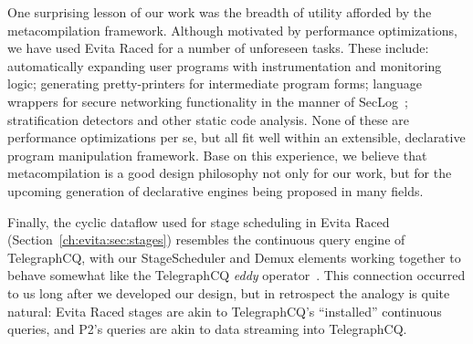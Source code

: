 One surprising lesson of our work was the breadth of utility afforded by the
metacompilation framework.  Although motivated by performance optimizations, we
have used Evita Raced for a number of unforeseen tasks.  These include:
automatically expanding user programs with instrumentation and monitoring
logic; generating pretty-printers for intermediate program forms; language
wrappers for secure networking functionality in the manner of
SecLog~\cite{abadi-netdb07}; stratification detectors and other static code
analysis.  None of these are performance optimizations per se, but all fit well
within an extensible, declarative program manipulation framework.  Base on this
experience, we believe that metacompilation is a good design philosophy not
only for our work, but for the upcoming generation of declarative engines being
proposed in many fields.

Finally, the cyclic dataflow used for stage scheduling in Evita Raced
(Section~\ref{ch:evita:sec:stages}) resembles the continuous query engine of
TelegraphCQ, with our StageScheduler and Demux elements working together to
behave somewhat like the TelegraphCQ {\em eddy} operator~\cite{tcq-cidr}.  This
connection occurred to us long after we developed our design, but in retrospect
the analogy is quite natural: Evita Raced stages are akin to TelegraphCQ's
``installed'' continuous queries, and P2's \OVERLOG queries are akin to data
streaming into TelegraphCQ.

